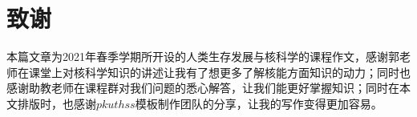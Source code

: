 \chapter{致谢}
本篇文章为2021年春季学期所开设的人类生存发展与核科学的课程作文，感谢郭老师在课堂上对核科学知识的讲述让我有了想更多了解核能方面知识的动力；同时也感谢助教老师在课程群对我们问题的悉心解答，让我们能更好掌握知识；同时在本文排版时，也感谢$pkuthss$模板制作团队的分享，让我的写作变得更加容易。